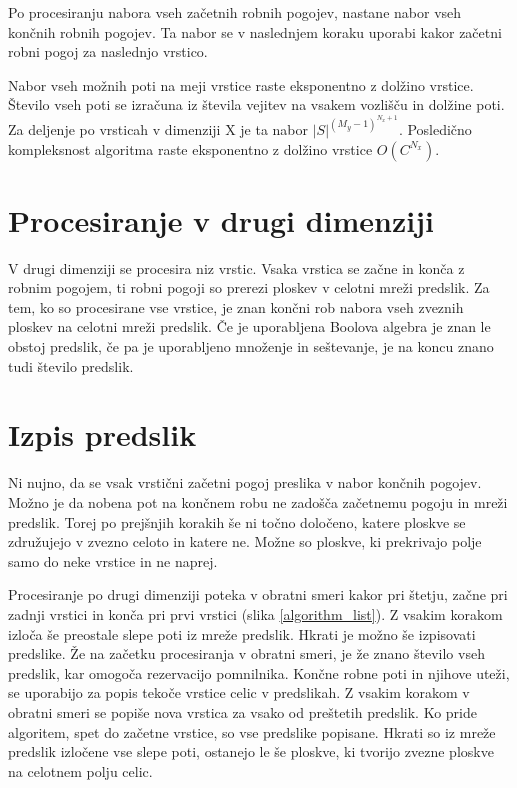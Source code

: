 \documentclass[12pt,a4paper,openany,twoside]{book}
\begin{document}
Po procesiranju nabora vseh začetnih robnih pogojev, nastane nabor vseh končnih robnih pogojev.
Ta nabor se v naslednjem koraku uporabi kakor začetni robni pogoj za naslednjo vrstico.

Nabor vseh možnih poti na meji vrstice raste eksponentno z dolžino vrstice.
Število vseh poti se izračuna iz števila vejitev na vsakem vozlišču in dolžine poti.
Za deljenje po vrsticah v dimenziji X je ta nabor \( |S|^{(M_y-1)^{N_x+1}} \).
Posledično kompleksnost algoritma raste eksponentno z dolžino vrstice \(O(C^{N_x})\).

\section{Procesiranje v drugi dimenziji}

V drugi dimenziji se procesira niz vrstic. Vsaka vrstica se začne in konča
z robnim pogojem, ti robni pogoji so prerezi ploskev v celotni mreži predslik.
Za tem, ko so procesirane vse vrstice, je znan končni rob nabora vseh zveznih
ploskev na celotni mreži predslik. Če je uporabljena Boolova algebra je znan
le obstoj predslik, če pa je uporabljeno množenje in seštevanje,
je na koncu znano tudi število predslik.

\section{Izpis predslik}

Ni nujno, da se vsak vrstični začetni pogoj preslika v nabor končnih pogojev.
Možno je da nobena pot na končnem robu ne zadošča začetnemu pogoju in mreži predslik.
Torej po prejšnjih korakih še ni točno določeno, katere ploskve se združujejo v zvezno
celoto in katere ne. Možne so ploskve, ki prekrivajo polje samo do neke vrstice in ne naprej.

Procesiranje po drugi dimenziji poteka v obratni smeri kakor pri štetju,
začne pri zadnji vrstici in konča pri prvi vrstici (slika \ref{algorithm_list}).
Z vsakim korakom izloča še preostale slepe poti iz mreže predslik.
Hkrati je možno še izpisovati predslike. Že na začetku procesiranja v obratni smeri,
je že znano število vseh predslik, kar omogoča rezervacijo pomnilnika.
Končne robne poti in njihove uteži, se uporabijo za popis tekoče vrstice celic
v predslikah. Z vsakim korakom v obratni smeri se popiše nova vrstica za vsako od preštetih predslik.
Ko pride algoritem, spet do začetne vrstice, so vse predslike popisane.
Hkrati so iz mreže predslik izločene vse slepe poti, ostanejo le še ploskve,
ki tvorijo zvezne ploskve na celotnem polju celic.
\end{document}
